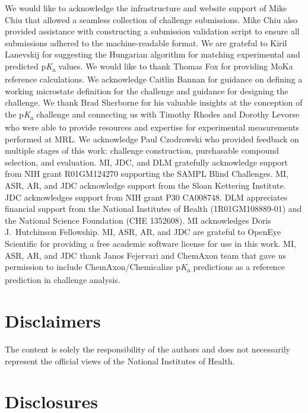 \documentclass[9pt,lineno,final]{elife}
\newcommand{\pKa}{p\textit{K}\textsubscript{a}}
\begin{document}
We would like to acknowledge the infrastructure and website support of Mike Chiu that allowed a seamless collection of challenge submissions. Mike Chiu also provided assistance with constructing a submission validation script to ensure all submissions adhered to the machine-readable format. 
We are grateful to Kiril Lanevskij for suggesting the Hungarian algorithm for matching experimental and predicted \pKa{} values. 
We would like to thank Thomas Fox for providing MoKa reference calculations.
We acknowledge Caitlin Bannan for guidance on defining a working microstate definition for the challenge and guidance for designing the challenge. 
We thank Brad Sherborne for his valuable insights at the conception of the \pKa{} challenge and connecting us with Timothy Rhodes and Dorothy Levorse who were able to provide resources and expertise for experimental measurements performed at MRL. 
We acknowledge Paul Czodrowski who provided feedback on multiple stages of this work: challenge construction, purchasable compound selection, and evaluation. %
MI, JDC, and DLM gratefully acknowledge support from NIH grant R01GM124270 supporting the SAMPL Blind Challenges.
MI, ASR, AR, and JDC acknowledge support from the Sloan Kettering Institute.
JDC acknowledges support from NIH grant P30 CA008748. 
DLM appreciates financial support from the National Institutes of Health (1R01GM108889-01) and the National Science Foundation (CHE 1352608).
MI acknowledges Doris J.\ Hutchinson Fellowship. 
MI, ASR, AR, and JDC are grateful to OpenEye Scientific for providing a free academic software license for use in this work.
MI, ASR, AR, and JDC thank Janos Fejervari and ChemAxon team that gave us permission to include ChemAxon/Chemicalize \pKa{} predictions as a reference prediction in challenge analysis. 


\section{Disclaimers}

The content is solely the responsibility of the authors and does not necessarily represent the official views of the National Institutes of Health.

\section{Disclosures}
\end{document}
